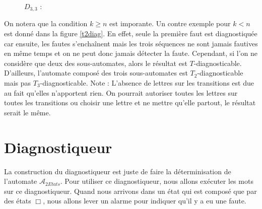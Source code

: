 \documentclass[conference]{IEEEtran}
\begin{document}
\begin{figure}
$D_{3,3}$ : 
\end{figure}

On notera que la condition $k\ge n$ est imporante. Un contre exemple pour $k<n$ est donné dans la figure \ref{t2diag}. En effet, seule la première faut est diagnostiquée car ensuite, les fautes s'enchaînent mais les trois séquences ne sont jamais fautives en même temps et on ne peut donc jamais détecter la faute. Cependant, si l'on ne considère que deux des sous-automates, alors le résultat est $T$-diagnosticable. D'ailleurs, l'automate composé des trois sous-automates est $T_2$-diagnosticable mais pas $T_3$-diagnosticable. Note : L'absence de lettres sur les transitions est due au fait qu'elles n'apportent rien. On pourrait autoriser toutes les lettres sur toutes les transitions ou choisir une lettre et ne mettre qu'elle partout, le résultat serait le même.


\section{Diagnostiqueur}

La construction du diagnostiqueur est juste de faire la d\'eterminisation de l'automate $\mathcal{A}_{2Etats}$. Pour utiliser ce diagnostiqueur, nous allons ex\'ecuter les mots sur ce diagnostiqueur. Quand nous arrivons dans un \'etat qui est compos\'e que par des \'etats $\Box$, nous allons lever un alarme pour indiquer qu'il y a eu une faute.
\end{document}
